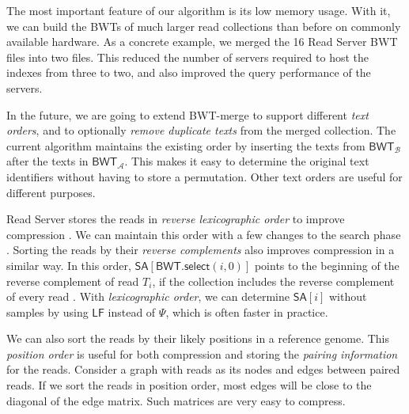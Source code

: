 \documentclass[smallabstract,smallcaptions]{dccpaper}
\newcommand{\BWT}{\textsf{BWT}}
\newcommand{\mSA}{\ensuremath{\mathsf{SA}}}
\newcommand{\mBWT}{\ensuremath{\mathsf{BWT}}}
\newcommand{\mLF}{\ensuremath{\mathsf{LF}}}
\newcommand{\mselect}{\ensuremath{\mathsf{select}}}
\newcommand{\Acoll}{\ensuremath{\mathcal{A}}}
\newcommand{\Bcoll}{\ensuremath{\mathcal{B}}}
\newcommand{\BWTmerge}{\textsf{BWT\nobreakdash-merge}}
\begin{document}
The most important feature of our algorithm is its low memory usage. With it, we can build the \BWT{}s of much larger read collections than before on commonly available hardware. As a concrete example, we merged the 16 Read Server \BWT{} files into two files. This reduced the number of servers required to host the indexes from three to two, and also improved the query performance of the servers.

In the future, we are going to extend \BWTmerge{} to support different \emph{text orders}, and to optionally \emph{remove duplicate texts} from the merged collection. The current algorithm maintains the existing order by inserting the texts from $\mBWT_{\Bcoll}$ after the texts in $\mBWT_{\Acoll}$. This makes it easy to determine the original text identifiers without having to store a permutation. Other text orders are useful for different purposes.

Read Server stores the reads in \emph{reverse lexicographic order} to improve compression \cite{Cox2012}. We can maintain this order with a few changes to the search phase \cite{Li2014a}. Sorting the reads by their \emph{reverse complements} also improves compression in a similar way. In this order, $\mSA[\mBWT.\mselect(i,0)]$ points to the beginning of the reverse complement of read $T_{i}$, if the collection includes the reverse complement of every read \cite{Li2014a}. With \emph{lexicographic order}, we can determine $\mSA[i]$ without samples by using $\mLF$ instead of $\Psi$, which is often faster in practice.

We can also sort the reads by their likely positions in a reference genome. This \emph{position order} is useful for both compression and storing the \emph{pairing information} for the reads. Consider a graph with reads as its nodes and edges between paired reads. If we sort the reads in position order, most edges will be close to the diagonal of the edge matrix. Such matrices are very easy to compress.




\end{document}
